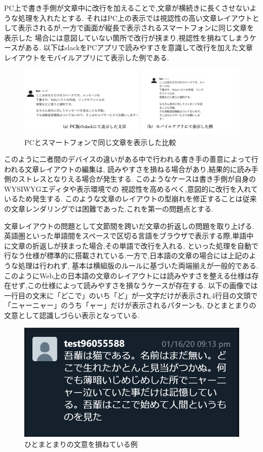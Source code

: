 PC上で書き手側が文章中に改行を加えることで,文章が横続きに長くさせないような処理を入れたとする.
それはPC上の表示では視認性の高い文章レイアウトとして表示されるが,一方で画面が縦長で表示されるスマートフォンに同じ文章を表示した
場合には意図していない箇所で改行が挟まり,視認性を損ねてしまうケースがある.
以下はslack\footnotemark[2]をPCアプリで読みやすさを意識して改行を加えた文章レイアウトをモバイルアプリにて表示した例である.



\begin{figure}[H]
    \centering
    \label{fig:image5}
    \includegraphics[width=0.9\columnwidth]{image/01/img3.png}
    \caption[PCとスマートフォンで同じ文章を表示した比較] {PCとスマートフォンで同じ文章を表示した比較}
\end{figure}

このように二者間のデバイスの違いがある中で行われる書き手の善意によって行われる文章レイアウトの編集は,
読みやすさを損ねる場合があり,結果的に読み手側のストレスとなりえる場合が発生する.
このようなケースは書き手側が自身のWYSIWYGエディタや表示環境での
視認性を高めるべく,意図的に改行を入れているため発生する.
このような文章のレイアウトの型崩れを修正することは従来の文章レンダリングでは困難であった.これを第一の問題点とする.


文章レイアウトの問題として文節間を跨いだ文章の折返しの問題を取り上げる.
英語圏といった単語間をスペースで区切る言語をブラウザで表示する際,単語中に文章の折返しが挟まった場合,その単語で改行を入れる,
といった処理を自動で行なう仕様が標準的に搭載されている.一方で,日本語の文章の場合には上記のような処理は行われず,
基本は横組版のルールに基づいた両端揃えが一般的である.
このようにWeb上の日本語の文章のレイアウトには読みやすさを整える仕様は存在せず,この仕様によって読みやすさを損なうケースが存在する.
以下の画像では一行目の文末に「どこで」のいち「ど」が一文字だけが表示され,4行目の文頭で「ニャーニャー」のうち「ャー」だけが表示されるパターンも,
ひとまとまりの文意として認識しづらい表示となっている.

\begin{figure}[H]
        \centering
        \label{fig:sokoneteiru}
        \includegraphics[width=0.7\columnwidth]{image/01/img5.png}
        \caption[ひとまとまりの文意を損ねている例] {ひとまとまりの文意を損ねている例}
\end{figure}

